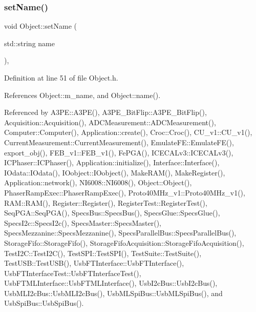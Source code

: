 \subsubsection{\texorpdfstring{set\+Name()}{setName()}}
{\footnotesize\ttfamily void Object\+::set\+Name (\begin{DoxyParamCaption}\item[{std\+::string}]{name }\end{DoxyParamCaption})\hspace{0.3cm}{\ttfamily [inline]}, {\ttfamily [inherited]}}



Definition at line 51 of file Object.\+h.



References Object\+::m\+\_\+name, and Object\+::name().



Referenced by A3\+P\+E\+::\+A3\+P\+E(), A3\+P\+E\+\_\+\+Bit\+Flip\+::\+A3\+P\+E\+\_\+\+Bit\+Flip(), Acquisition\+::\+Acquisition(), A\+D\+C\+Measurement\+::\+A\+D\+C\+Measurement(), Computer\+::\+Computer(), Application\+::create(), Croc\+::\+Croc(), C\+U\+\_\+v1\+::\+C\+U\+\_\+v1(), Current\+Measurement\+::\+Current\+Measurement(), Emulate\+F\+E\+::\+Emulate\+F\+E(), export\+\_\+obj(), F\+E\+B\+\_\+v1\+::\+F\+E\+B\+\_\+v1(), Fe\+P\+G\+A(), I\+C\+E\+C\+A\+Lv3\+::\+I\+C\+E\+C\+A\+Lv3(), I\+C\+Phaser\+::\+I\+C\+Phaser(), Application\+::initialize(), Interface\+::\+Interface(), I\+Odata\+::\+I\+Odata(), I\+Oobject\+::\+I\+Oobject(), Make\+R\+A\+M(), Make\+Register(), Application\+::network(), N\+I6008\+::\+N\+I6008(), Object\+::\+Object(), Phaser\+Ramp\+Exec\+::\+Phaser\+Ramp\+Exec(), Proto40\+M\+Hz\+\_\+v1\+::\+Proto40\+M\+Hz\+\_\+v1(), R\+A\+M\+::\+R\+A\+M(), Register\+::\+Register(), Register\+Test\+::\+Register\+Test(), Seq\+P\+G\+A\+::\+Seq\+P\+G\+A(), Specs\+Bus\+::\+Specs\+Bus(), Specs\+Glue\+::\+Specs\+Glue(), Specs\+I2c\+::\+Specs\+I2c(), Specs\+Master\+::\+Specs\+Master(), Specs\+Mezzanine\+::\+Specs\+Mezzanine(), Specs\+Parallel\+Bus\+::\+Specs\+Parallel\+Bus(), Storage\+Fifo\+::\+Storage\+Fifo(), Storage\+Fifo\+Acquisition\+::\+Storage\+Fifo\+Acquisition(), Test\+I2\+C\+::\+Test\+I2\+C(), Test\+S\+P\+I\+::\+Test\+S\+P\+I(), Test\+Suite\+::\+Test\+Suite(), Test\+U\+S\+B\+::\+Test\+U\+S\+B(), Usb\+F\+T\+Interface\+::\+Usb\+F\+T\+Interface(), Usb\+F\+T\+Interface\+Test\+::\+Usb\+F\+T\+Interface\+Test(), Usb\+F\+T\+M\+L\+Interface\+::\+Usb\+F\+T\+M\+L\+Interface(), Usb\+I2c\+Bus\+::\+Usb\+I2c\+Bus(), Usb\+M\+L\+I2c\+Bus\+::\+Usb\+M\+L\+I2c\+Bus(), Usb\+M\+L\+Spi\+Bus\+::\+Usb\+M\+L\+Spi\+Bus(), and Usb\+Spi\+Bus\+::\+Usb\+Spi\+Bus().


